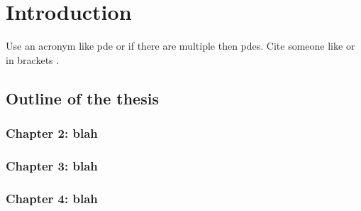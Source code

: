 
\chapter{Introduction}

Use an acronym like \ac{pde} or if there are multiple then \acp{pde}. Cite someone like \cite{einstein} or in brackets \citep{einstein}.

\lipsum



\section{Outline of the thesis}

\subsection{Chapter 2: blah}

\subsection{Chapter 3: blah}

\subsection{Chapter 4: blah}
